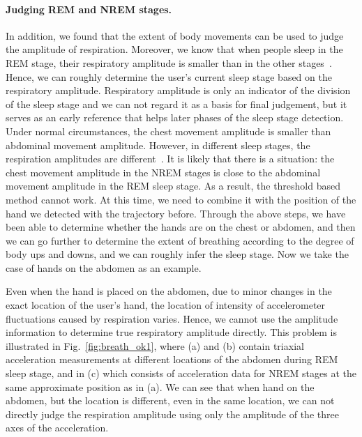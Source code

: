 \paragraph{Judging REM and NREM stages.}
In addition, we found that the extent of body movements can be used to judge the amplitude of respiration. Moreover, we know that when
people sleep in the REM stage, their respiratory amplitude is smaller than in the other stages~\cite{respiratory1982}. Hence, we can
roughly determine the user's current sleep stage based on the respiratory amplitude. Respiratory amplitude is only an indicator of the
division of the sleep stage and we can not regard it as a basis for final judgement, but it serves as an early reference that helps later
phases of the sleep stage detection. Under normal circumstances, the chest movement amplitude is smaller than abdominal movement amplitude.
However, in different sleep stages, the respiration amplitudes are different~\cite{respiratory}. It is likely that there is a situation:
the chest movement amplitude in the NREM stages is close to the abdominal movement amplitude in the REM sleep stage. As a result, the
threshold based method cannot work. At this time, we need to combine it with the position of the hand we detected with the trajectory
before. Through the above steps, we have been able to determine whether the hands are on the chest or abdomen, and then we can go further
to determine the extent of breathing according to the degree of body ups and downs, and we can roughly infer the sleep stage. Now we take
the case of hands on the abdomen as an example.



Even when the hand is placed on the abdomen, due to minor changes in the exact location of the user's hand, the location of intensity of accelerometer fluctuations caused by respiration varies. Hence, we cannot use the amplitude information to determine true respiratory amplitude directly. This problem is illustrated in Fig.~\ref{fig:breath_ok1}, where (a) and (b) contain triaxial acceleration measurements at different locations of the abdomen during REM sleep stage, and in (c) which consists of acceleration data for NREM stages at the same approximate position as in (a). We can see that when hand on the abdomen, but the location is different, even in the same location, we can not directly judge the respiration amplitude using only the amplitude of the three axes of the acceleration.

